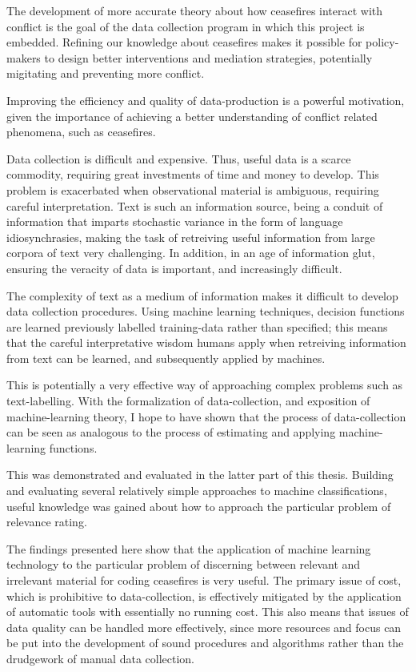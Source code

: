 \documentclass[12pt,twoside]{reedthesis}
\begin{document}
The development of more accurate theory about how ceasefires interact
with conflict is the goal of the data collection program in which this
project is embedded. Refining our knowledge about ceasefires makes it
possible for policy-makers to design better interventions and mediation
strategies, potentially migitating and preventing more conflict.

Improving the efficiency and quality of data-production is a powerful
motivation, given the importance of achieving a better understanding of
conflict related phenomena, such as ceasefires.

Data collection is difficult and expensive. Thus, useful data is a
scarce commodity, requiring great investments of time and money to
develop. This problem is exacerbated when observational material is
ambiguous, requiring careful interpretation. Text is such an information
source, being a conduit of information that imparts stochastic variance
in the form of language idiosynchrasies, making the task of retreiving
useful information from large corpora of text very challenging. In
addition, in an age of information glut, ensuring the veracity of data
is important, and increasingly difficult.

The complexity of text as a medium of information makes it difficult to
develop data collection procedures. Using machine learning techniques,
decision functions are learned previously labelled training-data rather
than specified; this means that the careful interpretative wisdom humans
apply when retreiving information from text can be learned, and
subsequently applied by machines.

This is potentially a very effective way of approaching complex problems
such as text-labelling. With the formalization of data-collection, and
exposition of machine-learning theory, I hope to have shown that the
process of data-collection can be seen as analogous to the process of
estimating and applying machine-learning functions.

This was demonstrated and evaluated in the latter part of this thesis.
Building and evaluating several relatively simple approaches to machine
classifications, useful knowledge was gained about how to approach the
particular problem of relevance rating.

The findings presented here show that the application of machine
learning technology to the particular problem of discerning between
relevant and irrelevant material for coding ceasefires is very useful.
The primary issue of cost, which is prohibitive to data-collection, is
effectively mitigated by the application of automatic tools with
essentially no running cost. This also means that issues of data quality
can be handled more effectively, since more resources and focus can be
put into the development of sound procedures and algorithms rather than
the drudgework of manual data collection.
\end{document}
